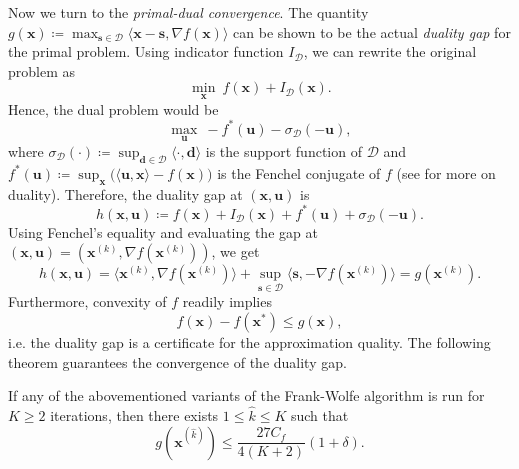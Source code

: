 \documentclass[12pt]{article}
\newenvironment{theorem}[2][Theorem]{\begin{trivlist}
\item[\hskip \labelsep {\bfseries #1}\hskip \labelsep {\bfseries #2.}]}{\end{trivlist}}
\begin{document}
Now we turn to the \textit{primal-dual convergence}. The quantity $g(\mathbf{x}) \coloneqq \max_{\mathbf{s} \in \mathcal{D}} \langle \mathbf{x}-\mathbf{s}, \nabla f(\mathbf{x}) \rangle$ can be shown to be the actual \textit{duality gap} for the primal problem. Using indicator function $I_{\mathcal{D}}$, we can rewrite the original problem as
\begin{equation}
    \min_{\mathbf{x}} \: f(\mathbf{x}) + I_{\mathcal{D}}(\mathbf{x}).
\end{equation}
Hence, the dual problem would be
\begin{equation}
    \max_{\mathbf{u}} \: -f^{*}(\mathbf{u}) - \sigma_{\mathcal{D}}(-\mathbf{u}),
\end{equation}
where $\sigma_{\mathcal{D}}(\cdot) \coloneqq \sup_{\mathbf{d}\in \mathcal{D}} \langle \cdot, \mathbf{d} \rangle$ is the support function of $\mathcal{D}$ and $f^{*}(\mathbf{u}) \coloneqq \sup_{\mathbf{x}} \big( \langle \mathbf{u},\mathbf{x} \rangle -f(\mathbf{x})\big)$ is the Fenchel conjugate of $f$ (see \cite{B} for more on duality). Therefore, the duality gap at $(\mathbf{x},\mathbf{u})$ is
\begin{equation}
    h(\mathbf{x},\mathbf{u}) \coloneqq f(\mathbf{x})+I_{\mathcal{D}}(\mathbf{x}) + f^{*}(\mathbf{u}) + \sigma_{\mathcal{D}}(-\mathbf{u}).
\end{equation}
Using Fenchel's equality and evaluating the gap at $(\mathbf{x},\mathbf{u}) = (\mathbf{x}^{(k)}, \nabla f(\mathbf{x}^{(k)}))$, we get
\begin{equation}
    h(\mathbf{x},\mathbf{u}) = \langle \mathbf{x}^{(k)},\nabla f(\mathbf{x}^{(k)}) \rangle + \sup_{\mathbf{s} \in \mathcal{D}} \langle \mathbf{s}, -\nabla f(\mathbf{x}^{(k)}) \rangle = g(\mathbf{x}^{(k)}). 
\end{equation}
Furthermore, convexity of $f$ readily implies
\begin{equation}
    f(\mathbf{x}) - f(\mathbf{x}^{*}) \leq g(\mathbf{x}),
\end{equation}
i.e. the duality gap is a certificate for the approximation quality. The following theorem guarantees the convergence of the duality gap.
\begin{theorem}{2}
If any of the abovementioned variants of the Frank-Wolfe algorithm is run for $K\geq 2$ iterations, then there exists $1 \leq \hat{k} \leq K$ such that
\begin{equation}
    g(\mathbf{x}^{(\hat{k})}) \leq \frac{27 C_f}{4(K+2)} (1+\delta).
\end{equation}
\end{theorem}
\end{document}
